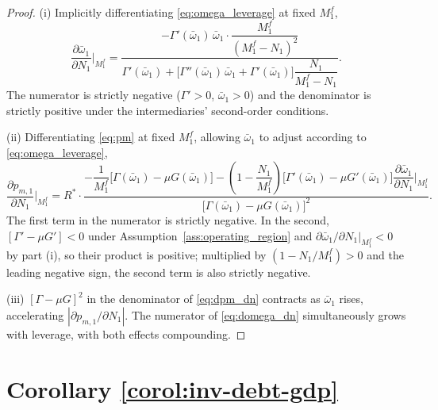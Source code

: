 \documentclass[11pt]{article}
\theoremstyle{definition}
\theoremstyle{plain}
\theoremstyle{remark}
\begin{document}
\begin{appendices}
\begin{proof}
(i) Implicitly differentiating \eqref{eq:omega_leverage} at fixed $M^f_1$,
\begin{equation}\label{eq:domega_dn}
\frac{\partial \bar{\omega}_1}{\partial N_1}\bigg|_{M^f_1} = \frac{-\Gamma'(\bar{\omega}_1)\,\bar{\omega}_1 \cdot \dfrac{M^f_1}{(M^f_1 - N_1)^2}}{\Gamma'(\bar{\omega}_1) + \bigl[\Gamma''(\bar{\omega}_1)\,\bar{\omega}_1 + \Gamma'(\bar{\omega}_1)\bigr]\dfrac{N_1}{M^f_1 - N_1}}.
\end{equation}
The numerator is strictly negative ($\Gamma' > 0$, $\bar{\omega}_1 > 0$) and the denominator 
is strictly positive under the intermediaries' second-order conditions.

(ii) Differentiating \eqref{eq:pm} at fixed $M^f_1$, allowing $\bar{\omega}_1$ to adjust 
according to \eqref{eq:omega_leverage},
\begin{equation}\label{eq:dpm_dn}
\frac{\partial p_{m,1}}{\partial N_1}\bigg|_{M^f_1} = R^* \cdot \frac{-\dfrac{1}{M^f_1}\bigl[\Gamma(\bar{\omega}_1) - \mu G(\bar{\omega}_1)\bigr] - \left(1 - \dfrac{N_1}{M^f_1}\right)\!\bigl[\Gamma'(\bar{\omega}_1) - \mu G'(\bar{\omega}_1)\bigr]\dfrac{\partial \bar{\omega}_1}{\partial N_1}\Big|_{M^f_1}}{\bigl[\Gamma(\bar{\omega}_1) - \mu G(\bar{\omega}_1)\bigr]^2}.
\end{equation}
The first term in the numerator is strictly negative. In the second, $[\Gamma' - \mu G'] < 0$ 
under Assumption~\ref{ass:operating_region} and $\partial \bar{\omega}_1/\partial N_1|_{M^f_1} < 0$ by part (i), 
so their product is positive; multiplied by $(1 - N_1/M^f_1) > 0$ and the leading negative 
sign, the second term is also strictly negative.

(iii) $[\Gamma - \mu G]^2$ in the denominator of \eqref{eq:dpm_dn} 
contracts as $\bar{\omega}_1$ rises, accelerating $|\partial p_{m,1}/\partial N_1|$. 
The numerator of \eqref{eq:domega_dn} simultaneously grows with leverage, with both effects compounding.
\end{proof}

\section{Corollary \ref{corol:inv-debt-gdp}} \label{ap:default-cost-debt-proof}


\end{appendices}
\end{document}
